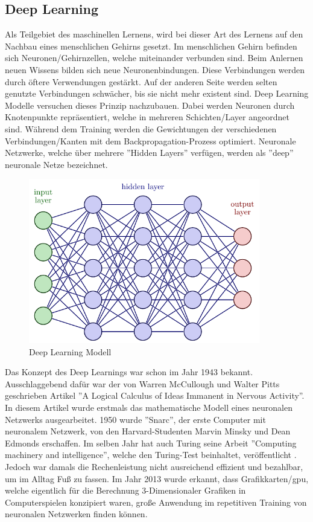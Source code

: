 \documentclass[12pt,a4paper]{article}
\begin{document}
\subsection{Deep Learning}
	Als Teilgebiet des maschinellen Lernens, wird bei dieser Art des Lernens auf den Nachbau eines menschlichen Gehirns gesetzt.
	Im menschlichen Gehirn befinden sich Neuronen/Gehirnzellen, welche miteinander verbunden sind. 
	Beim Anlernen neuen Wissens bilden sich neue Neuronenbindungen.
	Diese Verbindungen werden durch öftere Verwendungen gestärkt.
	Auf der anderen Seite werden selten genutzte Verbindungen schwächer, bis sie nicht mehr existent sind.
	Deep Learning Modelle versuchen dieses Prinzip nachzubauen.
	Dabei werden Neuronen durch Knotenpunkte repräsentiert, welche in mehreren Schichten/Layer angeordnet sind.
	Während dem Training werden die Gewichtungen der verschiedenen Verbindungen/Kanten mit dem Backpropagation-Prozess optimiert.
	Neuronale Netzwerke, welche über mehrere ''Hidden Layers'' verfügen, werden als ''deep'' neuronale Netze bezeichnet.
	 \cite[\ac{vgl}][S.424]{10.1111/bjd.18880}
	\begin{figure}[H]
		\begin{center}
			\includegraphics[width=0.9\textwidth, page=1]{Dateien/NeuralNetwork.pdf}
			\caption{Deep Learning Modell \cite[][]{site:neuralnetwork}}
			\label{img:deeplearning}
		\end{center}
	\end{figure}
	Das Konzept des Deep Learnings war schon im Jahr 1943 bekannt.
	Ausschlaggebend dafür war der von Warren McCullough und Walter Pitts geschrieben Artikel ''A Logical Calculus of Ideas Immanent in Nervous Activity''.
	In diesem Artikel wurde erstmals das mathematische Modell eines neuronalen Netzwerks ausgearbeitet.
	1950 wurde ''Snarc'', der erste Computer mit neuronalem Netzwerk, von den Harvard-Studenten Marvin Minsky und Dean Edmonds erschaffen.
	Im selben Jahr hat auch Turing seine Arbeit ''Computing machinery and intelligence'', welche den Turing-Test beinhaltet, veröffentlicht \cite[\ac{vgl}][]{site:datascientestki}.
	Jedoch war damals die Rechenleistung nicht ausreichend effizient und bezahlbar, um im Alltag Fuß zu fassen.
	Im Jahr 2013 wurde erkannt, dass Grafikkarten/\ac{gpu}, welche eigentlich für die Berechnung 3-Dimensionaler Grafiken in Computerspielen konzipiert waren, große Anwendung im repetitiven Training von neuronalen Netzwerken finden können.
\end{document}
